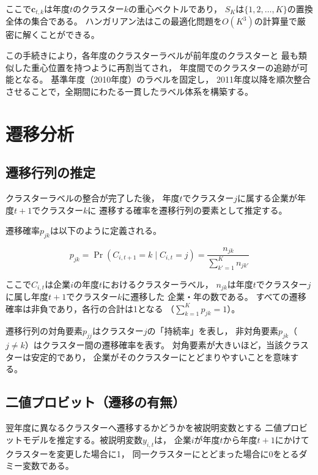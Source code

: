 ここで$\mathbf{c}_{t,k}$は年度$t$のクラスター$k$の重心ベクトルであり，
$S_K$は$\{1, 2, \ldots, K\}$の置換全体の集合である。
ハンガリアン法はこの最適化問題を$O(K^3)$の計算量で厳密に解くことができる。

この手続きにより，各年度のクラスターラベルが前年度のクラスターと
最も類似した重心位置を持つように再割当てされ，
年度間でのクラスターの追跡が可能となる。
基準年度（2010年度）のラベルを固定し，
2011年度以降を順次整合させることで，全期間にわたる一貫したラベル体系を構築する。

\section{遷移分析}
\label{sec:transition}

\subsection{遷移行列の推定}
\label{subsec:transition-matrix}

クラスターラベルの整合が完了した後，
年度$t$でクラスター$j$に属する企業が年度$t+1$でクラスター$k$に
遷移する確率を遷移行列の要素として推定する。

遷移確率$p_{jk}$は以下のように定義される。

\begin{equation}
  p_{jk} = \Pr(C_{i,t+1} = k \mid C_{i,t} = j)
  = \frac{n_{jk}}{\sum_{k'=1}^{K} n_{jk'}}
  \label{eq:transition-prob}
\end{equation}

ここで$C_{i,t}$は企業$i$の年度$t$におけるクラスターラベル，
$n_{jk}$は年度$t$でクラスター$j$に属し年度$t+1$でクラスター$k$に遷移した
企業・年の数である。
すべての遷移確率は非負であり，各行の合計は1となる
（$\sum_{k=1}^{K} p_{jk} = 1$）。

遷移行列の対角要素$p_{jj}$はクラスター$j$の「持続率」を表し，
非対角要素$p_{jk}$（$j \neq k$）はクラスター間の遷移確率を表す。
対角要素が大きいほど，当該クラスターは安定的であり，
企業がそのクラスターにとどまりやすいことを意味する。

\subsection{二値プロビット（遷移の有無）}
\label{subsec:probit}

翌年度に異なるクラスターへ遷移するかどうかを被説明変数とする
二値プロビットモデルを推定する。被説明変数$y_{i,t}$は，
企業$i$が年度$t$から年度$t+1$にかけてクラスターを変更した場合に1，
同一クラスターにとどまった場合に0をとるダミー変数である。

